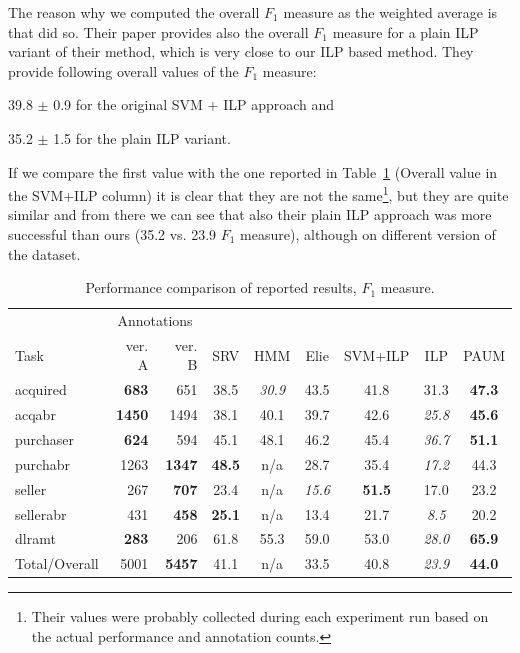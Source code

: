 The reason why we computed the overall $F_1$ measure as the weighted average is that \cite{DBLP:conf/ilp/RamakrishnanJBS07} did so. Their paper provides also the overall $F_1$ measure for a plain ILP variant of their method, which is very close to our ILP based method. They provide following overall values of the $F_1$ measure:
	
	39.8 $\pm$ 0.9 for the original SVM + ILP approach and
	
	35.2 $\pm$ 1.5 for the plain ILP variant.

\noindent If we compare the first value with the one reported in Table~\ref{tab:learning_acq_eval_third} (Overall value in the SVM+ILP column) it is clear that they are not the same\footnote{Their values were probably collected during each experiment run based on the actual performance and annotation counts.}, but they are quite similar and from there we can see that also their plain ILP approach was more successful than ours (35.2 vs. 23.9 $F_1$ measure), although on different version of the dataset.


\begin{table}
	\centering
\begin{tabular}{l|r>{\columncolor{lightgray}}r|ccc>{\columncolor{lightgray}}ccc}
\hline%
& \multicolumn{2}{c|}{Annotations} & \multicolumn{6}{c}{Extraction Method}\\
Task 				 &  ver. A 				 &  ver. B 				 &  SRV  					 &  HMM 				  &  Elie				  &  SVM+ILP			  &  ILP				  &  PAUM\\\hline%
acquired		 &  \textbf{683} 	 &  651 					 &  38.5 					 &  \emph{30.9}	  &  43.5				  &  41.8					  &  31.3				  & \textbf{47.3}\\
acqabr   		 &  \textbf{1450}  &  1494					 &  38.1 					 &  40.1 				  &  39.7				  &  42.6					  &  \emph{25.8}  & \textbf{45.6}\\
purchaser 	 &  \textbf{624} 	 &  594 					 &  45.1 					 &  48.1				  &  46.2				  &  45.4					  &  \emph{36.7}  & \textbf{51.1}\\
purchabr 		 &  1263 					 &  \textbf{1347}  &  \textbf{48.5}	 &  n/a 				  &  28.7				  &  35.4					  &  \emph{17.2}  & 44.3\\
seller 			 &  267 					 &  \textbf{707} 	 &  23.4 					 &  n/a 				  &  \emph{15.6}  &  \textbf{51.5}  &  17.0				  & 23.2\\
sellerabr 	 &  431 					 &  \textbf{458} 	 &  \textbf{25.1}  &  n/a 				  &  13.4 			  &  21.7 				  &  \emph{8.5}	  & 20.2\\
dlramt 			 &  \textbf{283} 	 &  206 					 &  61.8 					 &  55.3 				  &  59.0				  &  53.0 				  &  \emph{28.0}  & \textbf{65.9}\\\hline%
Total/Overall&  5001 					 &  \textbf{5457}	 &  41.1 					 &  n/a				 	  &  33.5				  &  40.8					  &  \emph{23.9}  & \textbf{44.0}\\
\hline%
\end{tabular}
\caption{Performance comparison of reported results, $F_1$ measure.}\label{tab:learning_acq_eval_third}
\end{table}

